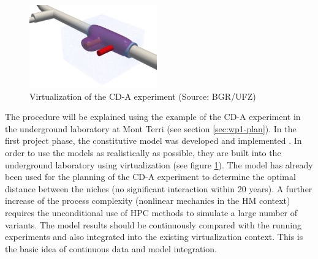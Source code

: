 \begin{figure}
\vspace{-5mm}
\centering
\includegraphics[width=0.49\textwidth]{figures/cd-a}
\caption{Virtualization of the CD-A experiment (Source: BGR/UFZ)}
\label{fig:vis-cd-a}
\end{figure}
The procedure will be explained using the example of the CD-A experiment in the underground laboratory at Mont Terri (see section \ref{sec:wp1-plan}). In the first project phase, the constitutive model was developed and implemented \cite{Vowinckel2020}. In order to use the models as realistically as possible, they are built into the underground laboratory using virtualization (see figure \ref{fig:vis-cd-a}). The model has already been used for the planning of the CD-A experiment to determine the optimal distance between the niches (no significant interaction within 20 years). A further increase of the process complexity (nonlinear mechanics in the HM context) requires the unconditional use of HPC methods to simulate a large number of variants. The model results should be continuously compared with the running experiments and also integrated into the existing virtualization context. This is the basic idea of continuous data and model integration.

